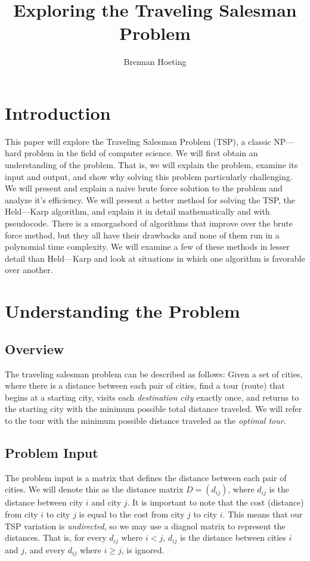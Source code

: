 \documentclass[11pt,fleqn]{article}
\begin{document}
\title{Exploring the Traveling Salesman Problem}
\author{Brennan Hoeting}
\date{}
\maketitle

\section*{Introduction}
This paper will explore the Traveling Salesman Problem (TSP),
a classic NP---hard problem in the field of computer science.
We will first obtain an understanding of the problem. That
is, we will explain the problem, examine its input and output,
and show why solving this problem particularly challenging.
We will present and explain a naive brute force solution to the
problem and analyze it's efficiency.  We will present a better
method for solving the TSP, the Held---Karp algorithm, and explain
it in detail mathematically and with pseudocode.  There is a
smorgasbord of algorithms that improve over the brute force method,
but they all have their drawbacks and none of them run in a polynomial
time complexity.  We will examine a few of these methods in lesser
detail than Held---Karp and look at situations in which one algorithm
is favorable over another.

\section{Understanding the Problem}
\subsection{Overview}
The traveling salesman problem can be described as follows:
Given a set of cities, where there is a distance between
each pair of cities, find a tour (route) that begins at a
starting city, visits each \textit{destination city} exactly once,
and returns to the starting city with the minimum possible
total distance traveled.  We will refer to the tour with the
minimum possible distance traveled as the \textit{optimal tour}.

\subsection{Problem Input}
The problem input is a matrix that defines the distance
between each pair of cities.  We will denote this as
the distance matrix $D = (d_{ij})$, where $d_{ij}$ is
the distance between city $i$ and city $j$.  It is important
to note that the cost (distance) from city $i$ to city $j$ is equal
to the cost from city $j$ to city $i$. This means that our
TSP variation is \textit{undirected}, so we may use a diagnol
matrix to represent the distances.  That is, for every $d_{ij}$
where $i<j$, $d_{ij}$ is the distance between cities $i$ and $j$,
and every $d_{ij}$ where $i\geq j$, is ignored.
\par
\end{document}
